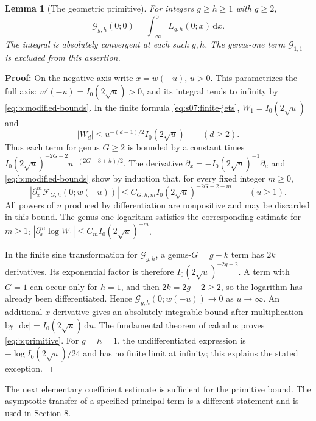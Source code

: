 \documentclass[a4paper,10pt]{article}
\numberwithin{equation}{section}
\newcommand{\dd}{\mathrm{d}}
\theoremstyle{paperplain}
\newtheorem{lmm}[thm]{Lemma}
\theoremstyle{paperremark}
\theoremstyle{paperplain}
\newenvironment{prf}{\noindent \textbf{Proof: }}{\hfill $\mdlgwhtsquare$\par\addvspace{0.5\baselineskip}}
\begin{document}
\begin{lmm}[The geometric primitive]\label{lmm:b:primitive}
For integers $g\geq h\geq1$ with $g\geq2$,
\begin{equation}\label{eq:b:primitive}
 \mathcal G_{g,h}(0;0)
                     =\int_{-\infty}^0 L_{g,h}(0;x)\,\dd x.
\end{equation}
The integral is absolutely convergent at each such $g,h$. The
genus-one term $\mathcal G_{1,1}$ is excluded from this assertion.
\end{lmm}
\begin{prf}
On the negative axis write $x=w(-u)$, $u>0$. This parametrizes
the full axis: $w'(-u)=I_0(2\sqrt u)>0$, and its integral tends
to infinity by \eqref{eq:b:modified-bounds}.
In the finite formula \eqref{eq:s07:finite-jets},
$W_1=I_0(2\sqrt u)$ and
\[
 |W_d|\leq u^{-(d-1)/2}I_0(2\sqrt u)\qquad(d\geq2).
\]
Thus each term for genus $G\geq2$ is bounded by a constant times
$I_0(2\sqrt u)^{-2G+2}u^{-(2G-3+h)/2}$.
The derivative $\partial_x=-I_0(2\sqrt u)^{-1}\partial_u$
and \eqref{eq:b:modified-bounds} show by induction that, for every
fixed integer $m\geq0$,
\[
 |\partial_x^m\mathcal F_{G,h}(0;w(-u))|
             \leq C_{G,h,m}I_0(2\sqrt u)^{-2G+2-m}
                         \qquad(u\geq1).
\]
All powers of $u$ produced by differentiation are nonpositive and
may be discarded in this bound. The genus-one logarithm satisfies
the corresponding estimate for $m\geq1$:
$|\partial_x^m\log W_1|\leq C_m I_0(2\sqrt u)^{-m}$.

In the finite sine transformation for $\mathcal G_{g,h}$, a
genus-$G=g-k$ term has $2k$ derivatives. Its exponential factor
is therefore $I_0(2\sqrt u)^{-2g+2}$. A term with $G=1$
can occur only for $h=1$, and then $2k=2g-2\geq2$, so the
logarithm has already been differentiated. Hence
$\mathcal G_{g,h}(0;w(-u))\to0$ as $u\to\infty$.
An additional $x$ derivative gives an absolutely integrable bound
after multiplication by $|\dd x|=I_0(2\sqrt u)\,\dd u$.
The fundamental theorem of calculus proves \eqref{eq:b:primitive}.
For $g=h=1$, the undifferentiated expression is
$-\log I_0(2\sqrt u)/24$ and has no finite limit at infinity;
this explains the stated exception.
\end{prf}

The next elementary coefficient estimate is sufficient for the
primitive bound. The asymptotic transfer of a specified principal
term is a different statement and is used in Section 8.
\end{document}
